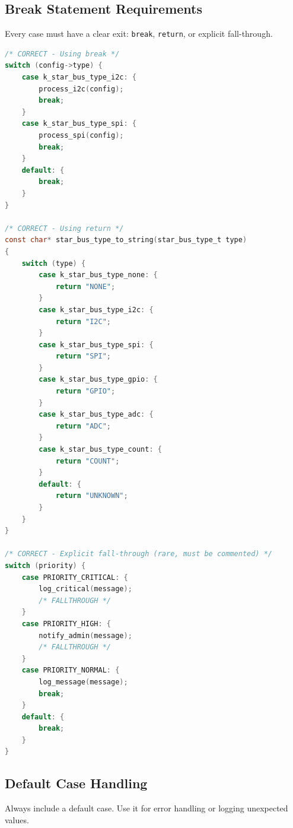 \subsection{Break Statement Requirements}

Every case must have a clear exit: \texttt{break}, \texttt{return}, or explicit fall-through.

\begin{lstlisting}[language=C]
/* CORRECT - Using break */
switch (config->type) {
    case k_star_bus_type_i2c: {
        process_i2c(config);
        break;
    }
    case k_star_bus_type_spi: {
        process_spi(config);
        break;
    }
    default: {
        break;
    }
}

/* CORRECT - Using return */
const char* star_bus_type_to_string(star_bus_type_t type)
{
    switch (type) {
        case k_star_bus_type_none: {
            return "NONE";
        }
        case k_star_bus_type_i2c: {
            return "I2C";
        }
        case k_star_bus_type_spi: {
            return "SPI";
        }
        case k_star_bus_type_gpio: {
            return "GPIO";
        }
        case k_star_bus_type_adc: {
            return "ADC";
        }
        case k_star_bus_type_count: {
            return "COUNT";
        }
        default: {
            return "UNKNOWN";
        }
    }
}

/* CORRECT - Explicit fall-through (rare, must be commented) */
switch (priority) {
    case PRIORITY_CRITICAL: {
        log_critical(message);
        /* FALLTHROUGH */
    }
    case PRIORITY_HIGH: {
        notify_admin(message);
        /* FALLTHROUGH */
    }
    case PRIORITY_NORMAL: {
        log_message(message);
        break;
    }
    default: {
        break;
    }
}
\end{lstlisting}

\subsection{Default Case Handling}

Always include a default case. Use it for error handling or logging unexpected values.

